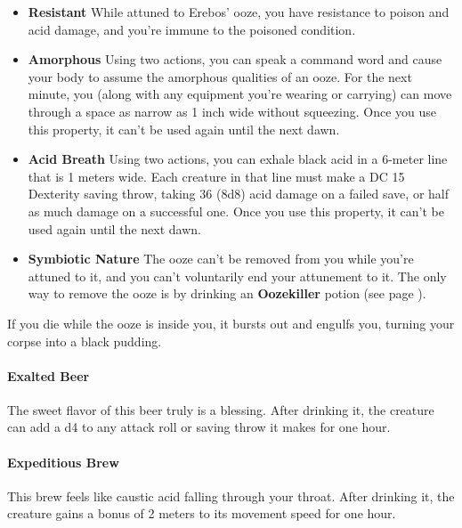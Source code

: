         \begin{itemize}
            \item \textbf{Resistant} While attuned to Erebos' ooze, you have resistance to poison and acid damage, and you're immune to the poisoned condition.
            \item \textbf{Amorphous} Using two actions, you can speak a command word and cause your body to assume the amorphous qualities of an ooze.
            For the next minute, you (along with any equipment you're wearing or carrying) can move through a space as narrow as 1 inch wide without squeezing.
            Once you use this property, it can't be used again until the next dawn.
            \item \textbf{Acid Breath} Using two actions, you can exhale black acid in a 6-meter line that is 1 meters wide.
            Each creature in that line must make a DC 15 Dexterity saving throw, taking 36 (8d8) acid damage on a failed save, or half as much damage on a successful one.
            Once you use this property, it can't be used again until the next dawn.
            \item \textbf{Symbiotic Nature} The ooze can't be removed from you while you're attuned to it, and you can't voluntarily end your attunement to it.
            The only way to remove the ooze is by drinking an \textbf{Oozekiller} potion (see page \pageref{item::oozekiller}).
        \end{itemize}

        If you die while the ooze is inside you, it bursts out and engulfs you, turning your corpse into a black pudding.
    \paragraph{Exalted Beer} %
        The sweet flavor of this beer truly is a blessing.
        After drinking it, the creature can add a d4 to any attack roll or saving throw it makes for one hour.
    \paragraph{Expeditious Brew} %
        This brew feels like caustic acid falling through your throat.
        After drinking it, the creature gains a bonus of 2 meters to its movement speed for one hour.
